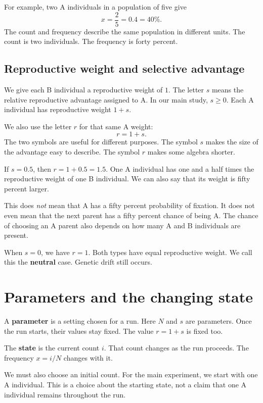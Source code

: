 For example, two A individuals in a population of five give
\[
  x=\frac{2}{5}=0.4=40\%.
\]
The count and frequency describe the same population in different units.
The count is two individuals. The frequency is forty percent.

\subsection{Reproductive weight and selective advantage}

We give each B individual a reproductive weight of \(1\). The letter \(s\)
means the relative reproductive advantage assigned to A. In our main study,
\(s\geq 0\). Each A individual has reproductive weight \(1+s\).

We also use the letter \(r\) for that same A weight:
\[
  r=1+s.
\]
The two symbols are useful for different purposes. The symbol \(s\) makes
the size of the advantage easy to describe. The symbol \(r\) makes some
algebra shorter.

\begin{workedexample}
If \(s=0.5\), then \(r=1+0.5=1.5\). One A individual has one and a half
times the reproductive weight of one B individual. We can also say that its
weight is fifty percent larger.

This does \emph{not} mean that A has a fifty percent probability of fixation.
It does not even mean that the next parent has a fifty percent chance of
being A. The chance of choosing an A parent also depends on how many A and
B individuals are present.
\end{workedexample}

When \(s=0\), we have \(r=1\). Both types have equal reproductive weight.
We call this the \textbf{neutral} case. Genetic drift still occurs.

\section{Parameters and the changing state}

A \textbf{parameter} is a setting chosen for a run. Here \(N\) and \(s\)
are parameters. Once the run starts, their values stay fixed. The value
\(r=1+s\) is fixed too.

The \textbf{state} is the current count \(i\). That count changes as the run
proceeds. The frequency \(x=i/N\) changes with it.

We must also choose an initial count. For the main experiment, we start with
one A individual. This is a choice about the starting state, not a claim
that one A individual remains throughout the run.


